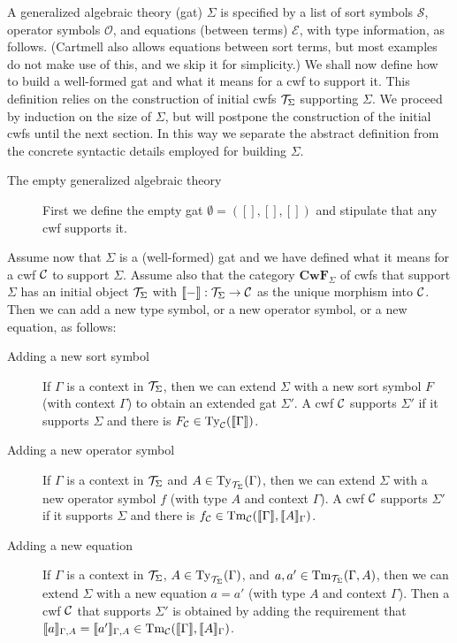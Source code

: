 \documentclass{lmcs}
\def\Sort{\mathcal{S}}
\def\Op{\mathcal{O}}
\def\Eq{\mathcal{E}}
\def\Cwf{\mathbf{CwF}}
\begin{document}
A generalized algebraic theory (gat) $\Sigma$  is specified by a list of sort symbols $\Sort$, operator symbols $\Op$, and equations (between terms) $\Eq$, with type information, as follows. (Cartmell also allows equations between sort terms, but most examples do not make use of this, and we skip it for simplicity.) We shall now define how to build a well-formed gat and what it means for a cwf to support it. This definition relies on the construction of initial cwfs ${\mathcal T}_\Sigma$ supporting $\Sigma$. We proceed by induction on the size of $\Sigma$, but will postpone the construction of the initial cwfs until the next section. In this way we separate the abstract definition from the concrete syntactic details employed for building $\Sigma$.
\begin{description}
\item[The empty generalized algebraic theory] First we define the empty gat $\emptyset = ([],[],[])$ and stipulate that any cwf supports it. 
\end{description}
Assume now that $\Sigma$ is a (well-formed) gat and we have defined what it means for a cwf ${\mathcal C}$ to support $\Sigma$. Assume also that the category $\Cwf_\Sigma$ of cwfs that support $\Sigma$ has an initial object ${\mathcal T}_\Sigma$ with $\llbracket - \rrbracket : {\mathcal T}_\Sigma \to {\mathcal C}$ as the unique morphism into ${\mathcal C}$. Then we can add a new type symbol, or a new operator symbol, or a new equation, as follows:
\begin{description}
\item[Adding a new sort symbol] 
If $\Gamma$ is a context in ${\mathcal T}_\Sigma$, then we can extend $\Sigma$ with a new sort symbol $F$ (with context $\Gamma$) to obtain an extended gat $\Sigma'$. A cwf ${\mathcal C}$ supports $\Sigma'$ if it supports $\Sigma$ and there is $F_{\mathcal C} \in \mathrm{Ty}_{\mathcal C}(\llbracket \Gamma \rrbracket)$.
\item[Adding a new operator symbol] 
If $\Gamma$ is a context in ${\mathcal T}_\Sigma$ and $A \in \mathrm{Ty}_{{\mathcal T}_\Sigma}(\Gamma)$, then we can extend $\Sigma$ with a new operator symbol $f$ (with type $A$ and context $\Gamma$). A cwf ${\mathcal C}$ supports $\Sigma'$ if it supports $\Sigma$ and there is $f_{\mathcal C} \in\mathrm{Tm}_{\mathcal C}(\llbracket \Gamma \rrbracket,\llbracket A \rrbracket_{\Gamma})$.
\item[Adding a new equation] 
If $\Gamma$ is a context in ${\mathcal T}_\Sigma$, $A \in \mathrm{Ty}_{{\mathcal T}_\Sigma}(\Gamma)$, and $a, a' \in \mathrm{Tm}_{{\mathcal T}_\Sigma}(\Gamma,A)$, then we can extend $\Sigma$ with a new equation $a = a'$ (with type $A$ and context $\Gamma$). Then a cwf ${\mathcal C}$ that supports $\Sigma'$ is obtained by adding the requirement that $\llbracket a \rrbracket_{\Gamma,A}= \llbracket a' \rrbracket_{\Gamma,A} \in \mathrm{Tm}_{\mathcal C}(\llbracket \Gamma \rrbracket,\llbracket A \rrbracket_\Gamma)$.
\end{description}
\end{document}
